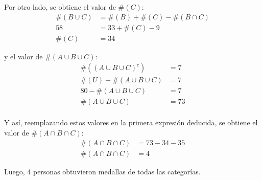\documentclass[a4paper,10pt]{article}
\begin{document}
    Por otro lado, se obtiene el valor de $\#(C)$:
        \begin{align*}
            \#(B \cup C) &= \#(B) + \#(C) - \#(B \cap C) \\
                      58 &= 33 + \#(C) - 9 \\
                   \#(C) &= 34
        \end{align*}

    y el valor de $\#(A \cup B \cup C)$:
        \begin{align*}
            \#\left( (A \cup B \cup C)^c \right)    &= 7 \\
            \#(U) - \#\left(A \cup B \cup C \right) &= 7 \\
            80 - \#\left(A \cup B \cup C \right)    &= 7 \\
            \#\left(A \cup B \cup C \right)         &= 73 \\
        \end{align*}


    Y así, reemplazando estos valores en la primera expresión deducida, se obtiene el valor de $\#(A \cap B \cap C)$:
    \begin{align*}
            \#(A \cap B \cap C) &= 73 - 34 - 35 \\
            \#(A \cap B \cap C) &= 4
        \end{align*}

    Luego, 4 personas obtuvieron medallas de todas las categorías.
\end{document}
